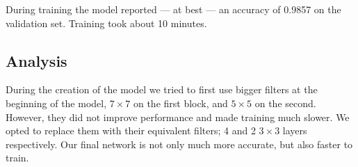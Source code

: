 During training the model reported --- at best --- an accuracy of \num{0.9857}
on the validation set. Training took about 10 minutes.

\subsection{Analysis}

During the creation of the model we tried to first use bigger filters at the
beginning of the model, \(7\times7\) on the first block, and \(5\times5\) on
the second. However, they did not improve performance and made training much
slower. We opted to replace them with their equivalent filters; 4 and 2
\(3\times3\) layers respectively. Our final network is not only much more
accurate, but also faster to train.


